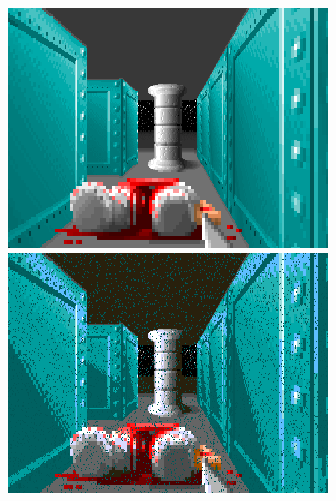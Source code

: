 \begin{minipage}{\textwidth}
\centering
  \includegraphics[width=.9\textwidth]{screenshots/fizzlefade/boss/screenshot_60.png} \\
  \vspace*{0.5cm}
  \includegraphics[width=.9\textwidth]{screenshots/fizzlefade/boss/screenshot_66.png}  \\
\end{minipage}

